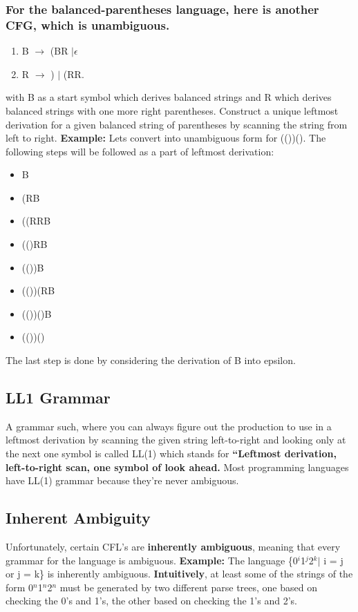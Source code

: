\documentclass{report}
\begin{document}
\subsubsection{For the balanced-parentheses language, here is another CFG, which is
unambiguous.}
\begin{enumerate}
    \item B $\rightarrow$ (BR $| \epsilon$
    \item R $\rightarrow$ ) $|$ (RR. 
\end{enumerate}
with B as a start symbol which derives balanced strings and R which derives balanced strings with one more right parentheses. Construct a unique leftmost derivation for
a given balanced string of parentheses by scanning the string from left to right. 
\textbf{Example:} Lets convert into unambiguous form for (())(). The following steps will be followed as a part of leftmost derivation:
\begin{itemize}
    \item B
    \item (RB
    \item ((RRB
    \item (()RB
    \item (())B
    \item (())(RB
    \item (())()B
    \item (())() 
\end{itemize}
The last step is done by considering the derivation of B into epsilon. 
\subsection{LL1 Grammar}
A grammar such, where you can always figure out the production to use in a leftmost
derivation by scanning the given string left-to-right and looking only at the next
one symbol is called LL(1) which stands for \textbf{“Leftmost derivation, left-to-right scan, one symbol of look ahead.} Most programming languages have LL(1) grammar because they're never ambiguous. 
\subsection{Inherent Ambiguity}
Unfortunately, certain CFL’s are \textbf{inherently ambiguous}, meaning that every grammar for the language is ambiguous. \textbf{Example:} The language \{0$^i$1$^j$2$^k |$ i = j or j = k\} is inherently ambiguous. \textbf{Intuitively}, at least some of the strings of the form 0$^n$1$^n$2$^n$ must be generated by two different parse trees, one based on checking the 0’s and 1’s, the other based on checking the 1’s and 2’s.
\end{document}
